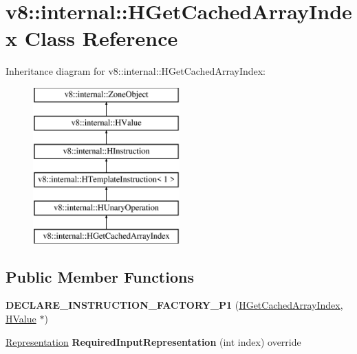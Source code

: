 \hypertarget{classv8_1_1internal_1_1_h_get_cached_array_index}{}\section{v8\+:\+:internal\+:\+:H\+Get\+Cached\+Array\+Index Class Reference}
\label{classv8_1_1internal_1_1_h_get_cached_array_index}
Inheritance diagram for v8\+:\+:internal\+:\+:H\+Get\+Cached\+Array\+Index\+:\begin{figure}[H]
\begin{center}
\leavevmode
\includegraphics[height=6.000000cm]{classv8_1_1internal_1_1_h_get_cached_array_index}
\end{center}
\end{figure}
\subsection*{Public Member Functions}
\begin{DoxyCompactItemize}
\item 
{\bfseries D\+E\+C\+L\+A\+R\+E\+\_\+\+I\+N\+S\+T\+R\+U\+C\+T\+I\+O\+N\+\_\+\+F\+A\+C\+T\+O\+R\+Y\+\_\+\+P1} (\hyperlink{classv8_1_1internal_1_1_h_get_cached_array_index}{H\+Get\+Cached\+Array\+Index}, \hyperlink{classv8_1_1internal_1_1_h_value}{H\+Value} $\ast$)\hypertarget{classv8_1_1internal_1_1_h_get_cached_array_index_a17610a6d66ef0e745fffb19667e37fb5}{}\label{classv8_1_1internal_1_1_h_get_cached_array_index_a17610a6d66ef0e745fffb19667e37fb5}

\item 
\hyperlink{classv8_1_1internal_1_1_representation}{Representation} {\bfseries Required\+Input\+Representation} (int index) override\hypertarget{classv8_1_1internal_1_1_h_get_cached_array_index_ae5611ea90a26df33c8f14e5e3d756c94}{}\label{classv8_1_1internal_1_1_h_get_cached_array_index_ae5611ea90a26df33c8f14e5e3d756c94}

\end{DoxyCompactItemize}
